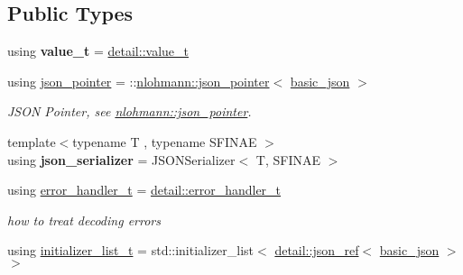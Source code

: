 \subsection*{Public Types}
\begin{DoxyCompactItemize}
\item 
\mbox{\label{classnlohmann_1_1basic__json_ae8cbef097f7da18a781fc86587de6b90}} 
using {\bfseries value\+\_\+t} = \mbox{\hyperlink{namespacenlohmann_1_1detail_a1ed8fc6239da25abcaf681d30ace4985}{detail\+::value\+\_\+t}}
\item 
\mbox{\label{classnlohmann_1_1basic__json_a6886a5001f5b449ad316101a311ce536}} 
using \mbox{\hyperlink{classnlohmann_1_1basic__json_a6886a5001f5b449ad316101a311ce536}{json\+\_\+pointer}} = \+::\mbox{\hyperlink{classnlohmann_1_1json__pointer}{nlohmann\+::json\+\_\+pointer}}$<$ \mbox{\hyperlink{classnlohmann_1_1basic__json}{basic\+\_\+json}} $>$
\begin{DoxyCompactList}\small\item\em J\+S\+ON Pointer, see \mbox{\hyperlink{classnlohmann_1_1json__pointer}{nlohmann\+::json\+\_\+pointer}}. \end{DoxyCompactList}\item 
\mbox{\label{classnlohmann_1_1basic__json_a7768841baaaa7a21098a401c932efaff}} 
{\footnotesize template$<$typename T , typename S\+F\+I\+N\+AE $>$ }\\using {\bfseries json\+\_\+serializer} = J\+S\+O\+N\+Serializer$<$ T, S\+F\+I\+N\+AE $>$
\item 
\mbox{\label{classnlohmann_1_1basic__json_ae56b6bfbb1f6d2f43611f2ada4f9e5f2}} 
using \mbox{\hyperlink{classnlohmann_1_1basic__json_ae56b6bfbb1f6d2f43611f2ada4f9e5f2}{error\+\_\+handler\+\_\+t}} = \mbox{\hyperlink{namespacenlohmann_1_1detail_a5a76b60b26dc8c47256a996d18d967df}{detail\+::error\+\_\+handler\+\_\+t}}
\begin{DoxyCompactList}\small\item\em how to treat decoding errors \end{DoxyCompactList}\item 
\mbox{\label{classnlohmann_1_1basic__json_ad70a098fbc01c53497db29d3b5b656a9}} 
using \mbox{\hyperlink{classnlohmann_1_1basic__json_ad70a098fbc01c53497db29d3b5b656a9}{initializer\+\_\+list\+\_\+t}} = std\+::initializer\+\_\+list$<$ \mbox{\hyperlink{classnlohmann_1_1detail_1_1json__ref}{detail\+::json\+\_\+ref}}$<$ \mbox{\hyperlink{classnlohmann_1_1basic__json}{basic\+\_\+json}} $>$ $>$

\end{DoxyCompactItemize}
